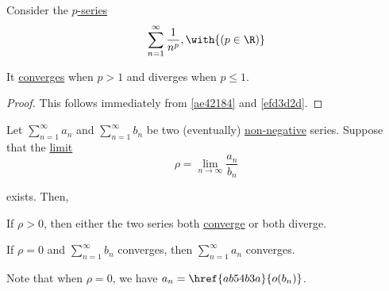 \label{e7faaa4}

Consider the \href{cccc2e8}{$p$-series}
$$
  \sum_{n=1}^\infty\frac1{n^p},\with{(p\in\R)}
$$

It \href{f8901df}{converges} when $p>1$ and diverges when $p\leq1$.

\begin{proof}
  This follows immediately from \autoref{ae42184} and \autoref{efd3d2d}.
\end{proof}

\label{ea5d3c5}

Let $\sum_{n=1}^\infty a_n$ and $\sum_{n=1}^\infty b_n$ be two (eventually)
\href{b6cffeb}{non-negative} series. Suppose that the \href{e565120}{limit}
$$
  \rho=\lim_{n\to\infty}\frac{a_n}{b_n}
$$

exists. Then,
\begin{enumerati}
  \item If $\rho>0$, then either the two series both \href{f8901df}{converge}
        or both diverge.
  \item If $\rho=0$ and $\sum_{n=1}^\infty b_n$ converges, then
        $\sum_{n=1}^\infty a_n$ converges.
\end{enumerati}

Note that when $\rho=0$, we have $a_n=\href{ab54b3a}{o(b_n)}$.

